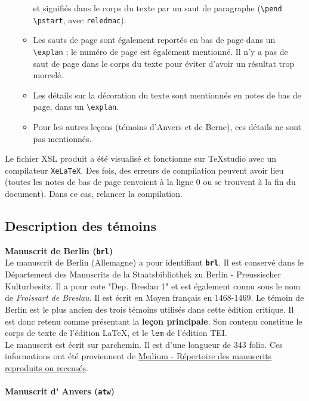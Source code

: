 \documentclass[12pt, a4paper]{article}
\begin{document}
\begin{itemize}
\begin{itemize}
{				et signifiés dans le corps du texte par un saut de paragraphe 
				(\texttt{\textbackslash pend \textbackslash pstart}, avec \texttt{reledmac}).} 
			\item{Les sauts de page sont également reportés en bas de page dans un 
				\texttt{\textbackslash explan} ; le numéro de page est également mentionné. Il n'y a 
				pas de saut de page dans le corps du texte pour éviter d'avoir un résultat 
				trop morcelé.}
			\item{Les détails sur la décoration du texte sont mentionnés en notes de 
				bas de page, dans un \texttt{\textbackslash explan}.}
			\item{Pour les autres leçons (témoins d'Anvers et de Berne), ces 
				détails ne sont pas mentionnés.}
		\end{itemize}
	\end{itemize} 
	
	\indent Le fichier XSL produit a été visualisé et fonctionne sur TeXstudio 
	avec un compilateur \texttt{XeLaTeX}. Des fois, des erreurs de compilation 
	peuvent avoir lieu (toutes les notes de bas de page renvoient à la ligne 0 
	ou se trouvent à la fin du document). Dans ce cas, relancer la compilation.
	
	\subsection{Description des témoins}
	\noindent \textbf{Manuscrit de Berlin (\texttt{brl})}\\
	
	\indent Le manuscrit de Berlin (Allemagne) a pour identifiant \textbf{\texttt{brl}}. Il est conservé dans le Département des Manuscrits de la  Staatsbibliothek zu Berlin - Preussischer Kulturbesitz. Il a pour cote "Dep. Breslau 1" et est également connu sous le nom de \textit{Froissart de Breslau}. Il est écrit en Moyen français en 1468-1469. Le témoin de Berlin est le plus ancien des trois témoins utilisés dans cette édition critique. Il est donc retenu comme présentant la \textbf{leçon principale}.
	Son contenu constitue le corps de texte de l'édition \LaTeX, et
	le \texttt{lem} de l'édition TEI.\\ \indent Le manuscrit est écrit sur parchemin. Il est d'une longueur de 343 folio. Ces informations ont été proviennent de \href{http://medium-avance.irht.cnrs.fr/ark:/63955/md44pk02gf53}{Medium - Répertoire des manuscrits reproduits ou recensés}.\\~\\\noindent \textbf{Manuscrit d' Anvers (\texttt{atw})}\\
	
\end{document}
